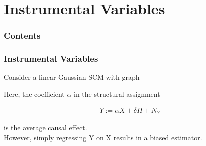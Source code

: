 \documentclass{beamer}
\begin{document}
\section{Instrumental Variables}

\begin{frame}
    \frametitle{Contents}
    \tableofcontents[currentsection]
\end{frame}

\begin{frame}
    \frametitle{Instrumental Variables}
    \begin{flushleft}
        Consider a linear Gaussian SCM with graph
    \end{flushleft}
    \begin{flushleft}
        Here, the coefficient $\alpha$ in the structural assignment
    \end{flushleft}
    \begin{align*}
        Y:= \alpha X + \delta H + N_Y
    \end{align*}
    \begin{flushleft}
        is the average causal effect. \\
        However, simply regressing Y on X results in a biased estimator.
    \end{flushleft}
\end{frame}
\end{document}
